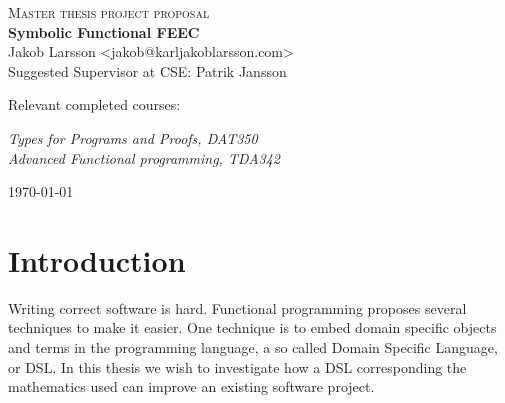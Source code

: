\documentclass{scrartcl}
\begin{document}
\begin{titlepage}

\centering
{\scshape\LARGE Master thesis project proposal\\}
\vspace{0.5cm}
{\huge\bfseries Symbolic Functional FEEC\\}
\vspace{2cm}
{\Large Jakob Larsson <jakob@karljakoblarsson.com>\\}
\vspace{1.0cm}
{\large Suggested Supervisor at CSE: Patrik Jansson \\}
\vspace{1.5cm}
{\large Relevant completed courses:\par}
{\itshape
Types for Programs and Proofs, DAT350 \\
Advanced Functional programming, TDA342 \\
}

\vfill
{\large \today\\}
\end{titlepage}


%
%

\section{Introduction}


Writing correct software is hard.
Functional programming proposes several techniques to make it easier.
One technique is to embed domain specific objects and terms in the programming
language, a so called Domain Specific Language, or DSL.
In this thesis we wish to investigate how a DSL
corresponding the mathematics used can improve an existing software project.
\end{document}
